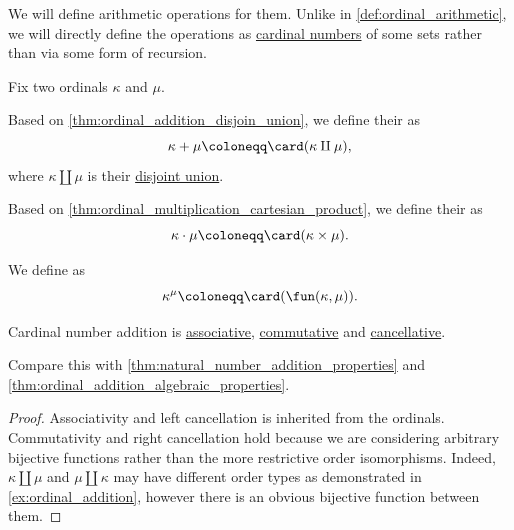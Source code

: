 \begin{definition}\label{def:cardinal_arithmetic}
  We will define arithmetic operations for them. Unlike in \cref{def:ordinal_arithmetic}, we will directly define the operations as \hyperref[def:cardinality]{cardinal numbers} of some sets rather than via some form of recursion.

  Fix two ordinals \( \kappa \) and \( \mu \).
  \begin{thmenum}
     Based on \cref{thm:ordinal_addition_disjoin_union}, we define their  as
    \begin{equation*}
      \kappa + \mu \coloneqq \card(\kappa \amalg \mu),
    \end{equation*}
    where \( \kappa \amalg \mu \) is their \hyperref[def:disjoint_union]{disjoint union}.

     Based on \cref{thm:ordinal_multiplication_cartesian_product}, we define their  as
    \begin{equation*}
      \kappa \cdot \mu \coloneqq \card(\kappa \times \mu).
    \end{equation*}

     We define  as
    \begin{equation*}
      \kappa^\mu \coloneqq \card(\fun(\kappa, \mu)).
    \end{equation*}
  \end{thmenum}
\end{definition}

\begin{proposition}\label{thm:cardinal_addition_algebraic_properties}
  Cardinal number addition is \hyperref[def:binary_operation/associative]{associative}, \hyperref[def:binary_operation/associative]{commutative} and \hyperref[def:binary_operation/cancellative]{cancellative}.

  Compare this with \cref{thm:natural_number_addition_properties} and \cref{thm:ordinal_addition_algebraic_properties}.
\end{proposition}
\begin{proof}
  Associativity and left cancellation is inherited from the ordinals. Commutativity and right cancellation hold because we are considering arbitrary bijective functions rather than the more restrictive order isomorphisms. Indeed, \( \kappa \amalg \mu \) and \( \mu \amalg \kappa \) may have different order types as demonstrated in \cref{ex:ordinal_addition}, however there is an obvious bijective function between them.
\end{proof}

